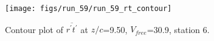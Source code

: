 \begin{figure}[H]
\centering
\texttt{[image: figs/run\_59/run\_59\_rt\_contour]}
\caption{Contour plot of $\overline{r^\prime t^\prime}$ at $z/c$=9.50, $V_{free}$=30.9, station 6.}
\end{figure}


